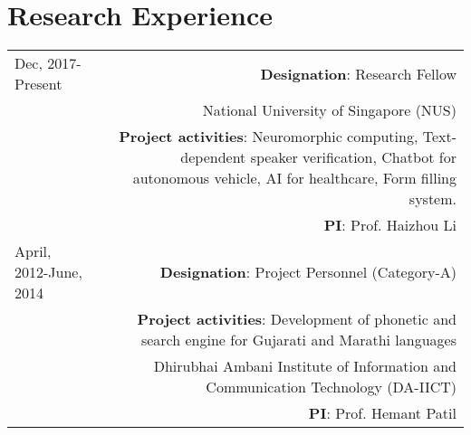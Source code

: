 \documentclass[10pt]{article}
\begin{document}
\section*{Research Experience}
\begin{tabular}{L!{\VRule}R}
Dec, 2017-Present&\textbf{Designation}: Research Fellow \\
& National University of Singapore (NUS)\\
	&\textbf{Project activities}: Neuromorphic computing, Text-dependent speaker verification, Chatbot for autonomous vehicle, AI for healthcare, Form filling system.\\
			&\textbf{PI}: Prof. Haizhou Li \vspace{0.3cm}\\
April, 2012-June, 2014&\textbf{Designation}: Project Personnel (Category-A) \\
&\textbf{Project activities}: Development of phonetic and search engine for Gujarati and Marathi languages \\
& Dhirubhai Ambani Institute of Information and Communication Technology (DA-IICT)\\
		&\textbf{PI}: Prof. Hemant Patil\\

	
\end{tabular}

\end{document}
